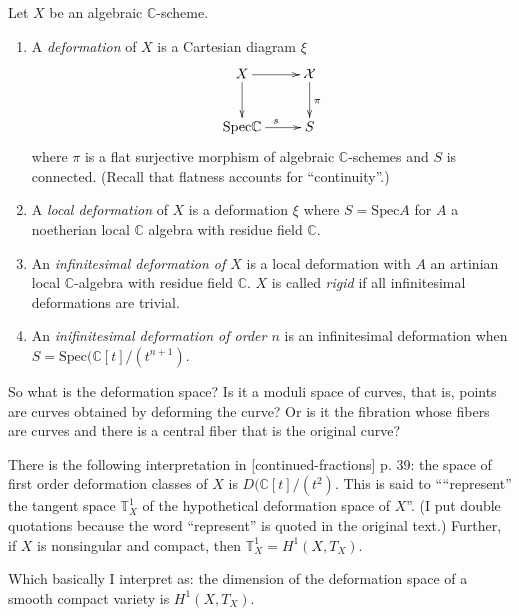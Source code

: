 \begin{definition}
\label{definition-deformation}
Let $X$ be an algebraic $\mathbb{C}$-scheme.
\begin{enumerate}
\item A {\it deformation} of $X$ is a Cartesian diagram $\xi$
$$
\xymatrix{
X\ar[r]\ar[d]&\mathcal{X}\ar[d]^{\pi}\\
\text{Spec}\mathbb{C}\ar[r]^s&S
}
$$
where $\pi$ is a flat surjective morphism of algebraic $\mathbb{C}$-schemes and
$S$ is connected. (Recall that flatness accounts for ``continuity''.)
\item A {\it local deformation} of $X$ is a deformation $\xi$ where
$S=\text{Spec}A$ for $A$ a noetherian local $\mathbb{C}$ algebra with residue
field $\mathbb{C}$.
\item An {\it infinitesimal deformation of $X$} is a local deformation with $A$
an artinian local $\mathbb{C}$-algebra with residue field $\mathbb{C}$. $X$ is
called {\it rigid} if all infinitesimal deformations are trivial.
\item An {\it inifinitesimal deformation of order $n$} is an infinitesimal
deformation when $S=\text{Spec}(\mathbb{C}[t]/(t^{n+1})$.
\end{enumerate}
\end{definition}

So what is the deformation space? Is it a moduli space of curves, that is,
points are curves obtained by deforming the curve? Or is it the fibration whose
fibers are curves and there is a central fiber that is the original curve?

There is the following interpretation in [continued-fractions] p. 39: the space
of first order deformation classes of $X$ is $D(\mathbb{C}[t]/(t^2)$. This is
said to ````represent'' the tangent space $\mathbb{T}^1_X$ of the hypothetical
deformation space of $X$''. (I put double quotations because the word
``represent'' is quoted in the original text.) Further, if $X$ is nonsingular
and compact, then $\mathbb{T}^1_X=H^{1}(X,T_X)$.

Which basically I interpret as: the dimension of the deformation space of a
smooth compact variety is $H^{1}(X,T_X)$.

